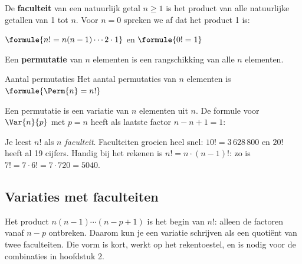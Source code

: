 \begin{theorie}
De \textbf{\textcolor{accent}{faculteit}} van een natuurlijk getal $n \geqslant 1$ is het product van alle natuurlijke getallen van 1 tot $n$. Voor $n = 0$ spreken we af dat het product 1 is:

\vspace{1mm}
\qquad $\formule{n! = n(n - 1) \cdots 2 \cdot 1}$ \qquad en \qquad $\formule{0! = 1}$

\vspace{1mm}
Een \textbf{\textcolor{accent}{permutatie}} van $n$ elementen is een rangschikking van alle $n$ elementen.

\begin{stelling}{Aantal permutaties}
Het aantal permutaties van $n$ elementen is \quad $\formule{\Perm{n} = n!}$
\end{stelling}

\begin{bewijs}
Een permutatie is een variatie van $n$ elementen uit $n$. De formule voor $\Var{n}{p}$ met $p = n$ heeft als laatste factor $n - n + 1 = 1$:
\end{bewijs}
\end{theorie}

Je leest $n!$ als \textit{$n$ faculteit}. Faculteiten groeien heel snel: $10! = 3\,628\,800$ en $20!$ heeft al 19 cijfers. Handig bij het rekenen is $n! = n \cdot (n - 1)!$: zo is $7! = 7 \cdot 6! = 7 \cdot 720 = 5040$.


\begin{oefeningen}
\end{oefeningen}

\subsection{Variaties met faculteiten}

Het product $n(n - 1) \cdots (n - p + 1)$ is het begin van $n!$: alleen de factoren vanaf $n - p$ ontbreken. Daarom kun je een variatie schrijven als een quotiënt van twee faculteiten. Die vorm is kort, werkt op het rekentoestel, en is nodig voor de combinaties in hoofdstuk 2.

